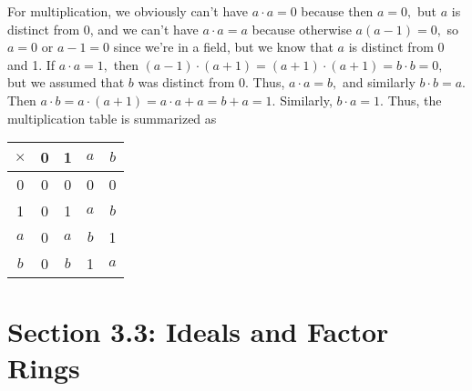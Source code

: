 \documentclass{article}
\begin{document}
\begin{itemize}
\begin{soln}
			For multiplication, we obviously can't have $a\cdot a=0$ because then $a=0,$ but $a$ is distinct from 0, and we can't have $a\cdot a = a$ because otherwise $a(a-1)=0,$ so $a=0$ or $a-1=0$ since we're in a field, but we know that $a$ is distinct from 0 and 1. If $a\cdot a =1,$ then $(a-1)\cdot(a+1) = (a+1)\cdot(a+1)=b\cdot b=0,$ but we assumed that $b$ was distinct from 0. Thus, $a\cdot a=b,$ and similarly $b\cdot b = a.$ Then $a\cdot b = a\cdot(a+1)=a\cdot a+ a= b + a = 1.$ Similarly, $b\cdot a=1.$ Thus, the multiplication table is summarized as
			\begin{center}
				\begin{tabular}{c|cccc}
					$\times$ & 0 & 1 & $a$ & $b$ \\
					\hline 
					0 & 0 & 0 & 0 & 0 \\
					1 & 0 & 1 & $a$ & $b$ \\
					$a$ & 0 & $a$ & $b$ & 1 \\
					$b$ & 0 & $b$ & 1 & $a$
				\end{tabular}
			\end{center}	
		\end{soln}
		
\end{itemize}

\section*{Section 3.3: Ideals and Factor Rings}
\end{document}
